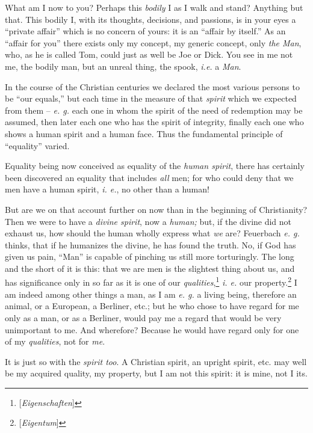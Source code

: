 \documentclass[12pt,a4paper]{book}
\begin{document}
What am I now to you? Perhaps this \textit{bodily} I as I walk and stand? 
Anything but that. This bodily I, with its thoughts, decisions, and passions, 
is in your eyes a ``private affair'' which is no concern of yours: it is an 
``affair by itself.'' As an ``affair for you'' there exists only my 
concept, my generic concept, only \textit{the Man}, who, as he is called Tom, 
could just as well be Joe or Dick. You see in me not me, the bodily man, but 
an unreal thing, the spook, \textit{i.e.} a \textit{Man}.

In the course of the Christian centuries we declared the most various persons 
to be ``our equals,'' but each time in the measure of that \textit{spirit} 
which we expected from them -- \textit{e. g.} each one in whom the spirit of 
the need of redemption may be assumed, then later each one who has the spirit 
of integrity, finally each one who shows a human spirit and a human face. Thus 
the fundamental principle of ``equality'' varied.

 Equality being now conceived as equality of the \textit{human spirit}, there 
has certainly been discovered an equality that includes \textit{all} men; for 
who could deny that we men have a human spirit, \textit{i. e.}, no other than 
a human!

But are we on that account further on now than in the beginning of 
Christianity? Then we were to have a \textit{divine spirit}, now a 
\textit{human;} but, if the divine did not exhaust us, how should the human 
wholly express what \textit{we} are? Feuerbach \textit{e. g.} thinks, that if 
he humanizes the divine, he has found the truth. No, if God has given us pain, 
``Man'' is capable of pinching us still more torturingly. The long and the 
short of it is this: that we are men is the slightest thing about us, and has 
significance only in so far as it is one of our 
\textit{qualities},\footnote{[\textit{Eigenschaften}]} \textit{i. e.} our 
property.\footnote{[\textit{Eigentum}]} I am indeed among other things a man, 
as I am \textit{e. g.} a living being, therefore an animal, or a European, a 
Berliner, etc.; but he who chose to have regard for me only as a man, or as a 
Berliner, would pay me a regard that would be very unimportant to me. And 
wherefore? Because he would have regard only for one of my \textit{qualities}, 
not for \textit{me}.

It is just so with the \textit{spirit too}. A Christian spirit, an upright 
spirit, etc. may well be my acquired quality, my property, but I am not this 
spirit: it is mine, not I its.
\end{document}
